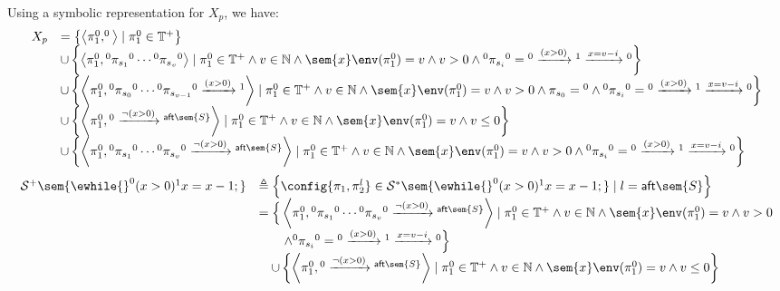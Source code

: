 \begin{example}
\[ \]
 Using a symbolic representation for $X_p$, we have:
 \[
 \begin{array}{ll}
 X_p &=  \left\{ \left< \pi_1^0, ^0\right> \mid \pi_1^0 \in \mathbb{T^{+}} \right\}
 \\ &  \cup 
 \left\{ \left< \pi_1^0, {}^0 \pi_{s_1} {}^0 \cdots {}^0 \pi_{s_v} {}^0\right>
 \mid \pi_1^0 \in \mathbb{T^{+}} \land v \in \mathbb{N} \land
 \sem{x}\env(\pi_1^0) = v
 \land v > 0  \land
 {}^0 \pi_{s_i} {}^0 = {}^0 \xrightarrow{(x > 0)} {}^1 \xrightarrow{x = v - i} {}^0\right\}
 \\ &  \cup 
 \left\{ \left< \pi_1^0, {}^0 \pi_{s_0} {}^0 \cdots {}^0 \pi_{s_{v - 1}} {}^0 \xrightarrow{(x > 0)} {}^1 \right>
 \mid \pi_1^0 \in \mathbb{T^{+}} \land v \in \mathbb{N} \land
 \sem{x}\env(\pi_1^0) = v
 \land v > 0 \land 
 \pi_{s_0} = {}^0  \land
 {}^0 \pi_{s_i} {}^0 = {}^0 \xrightarrow{(x > 0)} {}^1 \xrightarrow{x = v - i} {}^0\right\}
 \\ & \cup 
 \left\{ \left< \pi_1^0, {}^0 \xrightarrow{\neg(x > 0)} {}^{\mathsf{aft}\sem{S}} \right> 
 \mid \pi_1^0 \in \mathbb{T^{+}} \land v \in \mathbb{N} \land
  \sem{x}\env(\pi_1^0) = v
 \land v \leq 0 \right\}
\\ & \cup 
 \left\{ \left< \pi_1^0, {}^0 \pi_{s_1} {}^0 \cdots {}^0 \pi_{s_v} {}^0 \xrightarrow{\neg(x > 0)} {}^{\mathsf{aft}\sem{S}}\right>
 \mid \pi_1^0 \in \mathbb{T^{+}} \land v \in \mathbb{N} \land
 \sem{x}\env(\pi_1^0) = v
 \land v > 0  \land
 {}^0 \pi_{s_i} {}^0 = {}^0 \xrightarrow{(x > 0)} {}^1 \xrightarrow{x = v - i} {}^0
 \right\}
 \end{array}
 \]
 \[
 \begin{array}{ll}
  \mathcal{S}^{+}\sem{\ewhile {}^0 (x > 0) {}^1 x = x - 1;} 
  & \triangleq \left\{ \config{\pi_1, \pi_2^{l}} \in \mathcal{S}^{*}\sem{\ewhile {}^0 (x > 0) {}^1 x = x - 1;} \mid l = \mathsf{aft}\sem{S}
  \right\}\\
  & = \Big\{ \left< \pi_1^0, {}^0 \pi_{s_1} {}^0 \cdots {}^0 \pi_{s_v} {}^0 \xrightarrow{\neg(x > 0)} {}^{\mathsf{aft}\sem{S}}\right>
 \mid \pi_1^0 \in \mathbb{T^{+}} \land v \in \mathbb{N} \land
 \sem{x}\env(\pi_1^0) = v
 \land v > 0  
 \\ & \qquad \land
 {}^0 \pi_{s_i} {}^0 = {}^0 \xrightarrow{(x > 0)} {}^1 \xrightarrow{x = v - i} {}^0
 \Big\}
  \\ & \quad \cup 
 \left\{ \left< \pi_1^0, {}^0 \xrightarrow{\neg(x > 0)} {}^{\mathsf{aft}\sem{S}} \right> 
 \mid \pi_1^0 \in \mathbb{T^{+}} \land v \in \mathbb{N} \land
  \sem{x}\env(\pi_1^0) = v
 \land v \leq 0 \right\}
\end{array}
\]
\end{example}
